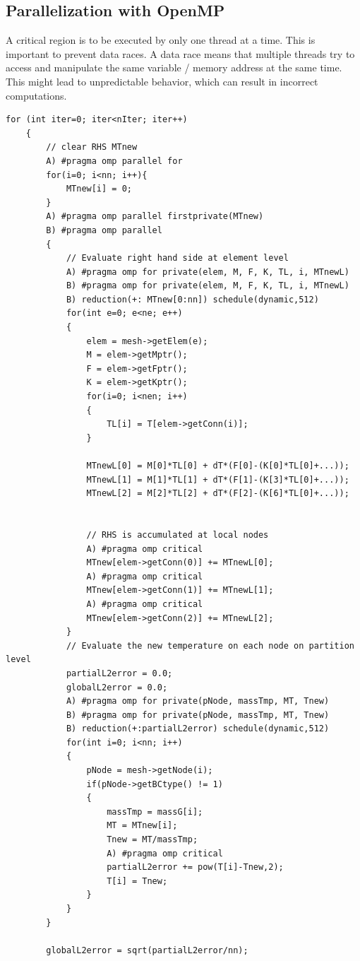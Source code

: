 \documentclass[a4paper, 11pt, oneside]{scrartcl}
\begin{document}
\subsection{Parallelization with OpenMP}

A critical region is to be executed by only one thread at a time. This is important to prevent data races. A data race means that multiple threads try to access and manipulate the same variable / memory address at the same time. This might lead to unpredictable behavior, which can result in incorrect computations. 

\begin{lstlisting}[caption={\label{Code:OpenMP} Parallelization of two most time consuming loops with implementation A and B}]
	for (int iter=0; iter<nIter; iter++)
	{
		// clear RHS MTnew
		A) #pragma omp parallel for
		for(i=0; i<nn; i++){
			MTnew[i] = 0;
		}
		A) #pragma omp parallel firstprivate(MTnew)
		B) #pragma omp parallel
		{
			// Evaluate right hand side at element level
			A) #pragma omp for private(elem, M, F, K, TL, i, MTnewL)
			B) #pragma omp for private(elem, M, F, K, TL, i, MTnewL) 
			B) reduction(+: MTnew[0:nn]) schedule(dynamic,512)
			for(int e=0; e<ne; e++)
			{
				elem = mesh->getElem(e);
				M = elem->getMptr();
				F = elem->getFptr();
				K = elem->getKptr();
				for(i=0; i<nen; i++)
				{
					TL[i] = T[elem->getConn(i)];
				}
				
				MTnewL[0] = M[0]*TL[0] + dT*(F[0]-(K[0]*TL[0]+...));
				MTnewL[1] = M[1]*TL[1] + dT*(F[1]-(K[3]*TL[0]+...));
				MTnewL[2] = M[2]*TL[2] + dT*(F[2]-(K[6]*TL[0]+...));
				
				
				// RHS is accumulated at local nodes
				A) #pragma omp critical
				MTnew[elem->getConn(0)] += MTnewL[0];
				A) #pragma omp critical
				MTnew[elem->getConn(1)] += MTnewL[1];
				A) #pragma omp critical
				MTnew[elem->getConn(2)] += MTnewL[2];
			}
			// Evaluate the new temperature on each node on partition level
			partialL2error = 0.0;
			globalL2error = 0.0;
			A) #pragma omp for private(pNode, massTmp, MT, Tnew)
			B) #pragma omp for private(pNode, massTmp, MT, Tnew) 
			B) reduction(+:partialL2error) schedule(dynamic,512)
			for(int i=0; i<nn; i++)
			{
				pNode = mesh->getNode(i);
				if(pNode->getBCtype() != 1)
				{
					massTmp = massG[i];
					MT = MTnew[i];
					Tnew = MT/massTmp;
					A) #pragma omp critical
					partialL2error += pow(T[i]-Tnew,2);
					T[i] = Tnew;
				}
			}
		}
		
		globalL2error = sqrt(partialL2error/nn);
\end{lstlisting}
\end{document}
